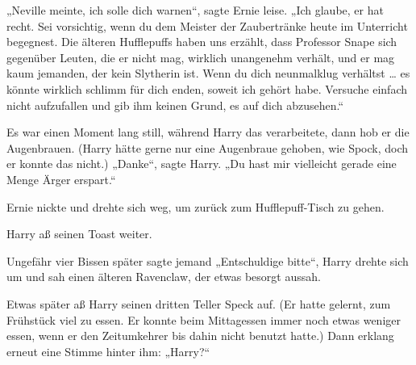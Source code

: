 „Neville meinte, ich solle dich warnen“, sagte Ernie leise.
„Ich glaube, er hat recht. Sei vorsichtig, wenn du dem Meister der Zaubertränke heute im Unterricht begegnest. Die älteren Hufflepuffs haben uns erzählt, dass Professor Snape sich gegenüber Leuten, die er nicht mag, wirklich unangenehm verhält, und er mag kaum jemanden, der kein Slytherin ist. Wenn du dich neunmalklug verhältst … es könnte wirklich schlimm für dich enden, soweit ich gehört habe. Versuche einfach nicht aufzufallen und gib ihm keinen Grund, es auf dich abzusehen.“

Es war einen Moment lang still, während Harry das verarbeitete, dann hob er die Augenbrauen. (Harry hätte gerne nur eine Augenbraue gehoben, wie Spock, doch er konnte das nicht.)
„Danke“, sagte Harry.
„Du hast mir vielleicht gerade eine Menge Ärger erspart.“

Ernie nickte und drehte sich weg, um zurück zum Hufflepuff-Tisch zu gehen.

Harry aß seinen Toast weiter.

Ungefähr vier Bissen später sagte jemand
„Entschuldige bitte“, Harry drehte sich um und sah einen älteren Ravenclaw, der etwas besorgt aussah.

Etwas später aß Harry seinen dritten Teller Speck auf. (Er hatte gelernt, zum Frühstück viel zu essen. Er konnte beim Mittagessen immer noch etwas weniger essen, wenn er den Zeitumkehrer bis dahin nicht benutzt hatte.) Dann erklang erneut eine Stimme hinter ihm:
„Harry?“

